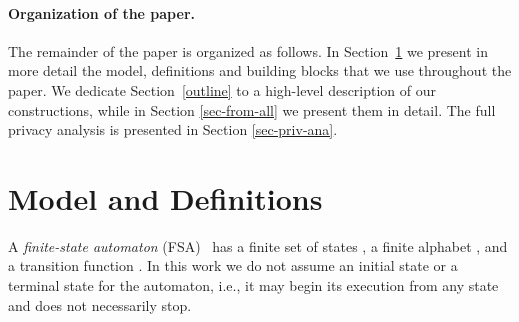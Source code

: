 \documentclass[letterpaper,11pt]{article}
\newcommand{\ignore}[1]{}
               {}
\newcommand{\A}{}
\begin{document}
\vspace{-.1in}

\paragraph{Organization of the paper.} The remainder of the paper is
organized as follows. In Section~\ref{sec-Prelim_and_outline} we present
in more detail the model, definitions and building blocks that we use 
throughout the paper. We dedicate Section~\ref{outline} to a high-level
description of our constructions, while in Section \ref{sec-from-all} we 
present them in detail. The full privacy analysis is presented in Section \ref{sec-priv-ana}. 
\ignore{The first scheme , in which we need all of the agents to reconstruct the current state of the computation is described in section~\ref{sec-from-all-details}. In section \ref{sec-from-t} we present two schemes  and , in which we need only a subset of the agents to reconstruct the current state of the computation. Sections \ref{sec-from-all-details} and \ref{sec-from-t} contain proofs of correctness and security.
} 

 
\section{Model and Definitions}
\label{sec-Prelim_and_outline}


A {\it finite-state automaton} (FSA) \A\ has a finite set of states
, a finite alphabet , and a transition
function . In this work we
do not assume an initial state or a terminal state for the automaton,
i.e., it may begin its execution from any state and does not
necessarily stop.
\end{document}
